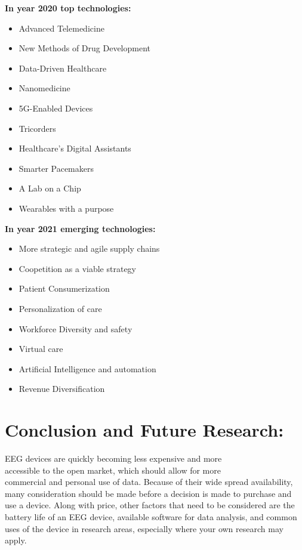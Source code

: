 \documentclass[12pt,a4paper]{article}
\begin{document}
\textbf {In year 2020 top technologies:}
\begin{itemize}
\item Advanced Telemedicine 
\item New Methods of Drug Development
\item Data-Driven Healthcare
\item Nanomedicine
\item 5G-Enabled Devices
\item Tricorders
\item Healthcare's Digital Assistants
\item Smarter Pacemakers
\item A Lab on a Chip
\item Wearables with a purpose
\end{itemize}

\clearpage

\textbf{In year 2021 emerging technologies:}
\begin{itemize}
\item More strategic and agile supply chains
\item Coopetition as a viable strategy
\item Patient Consumerization 
\item Personalization of care
\item Workforce Diversity and safety
\item Virtual care
\item Artificial Intelligence and automation 
\item Revenue Diversification

\end{itemize}


















\section{Conclusion and Future Research:}

EEG devices are quickly becoming less expensive and more\\ accessible to the open market, which should allow for more\\ commercial and personal use of data. Because of their wide spread availability, many consideration should be made before a decision is made to purchase and use a device. Along with price, other factors that need to be considered are the battery life of an EEG device, available software for data analysis, and common uses of the device in research areas, especially where your own research may apply.
\end{document}
